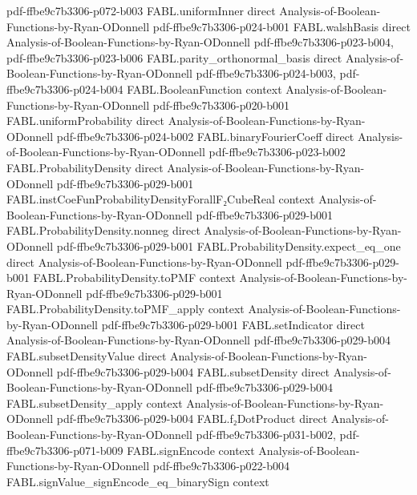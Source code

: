 \begin{theorem}
  {pdf-ffbe9c7b3306-p072-b003}
\proofstep
  {FABL.uniformInner}
  {direct}
  {Analysis-of-Boolean-Functions-by-Ryan-ODonnell}
  {pdf-ffbe9c7b3306-p024-b001}
\proofstep
  {FABL.walshBasis}
  {direct}
  {Analysis-of-Boolean-Functions-by-Ryan-ODonnell}
  {pdf-ffbe9c7b3306-p023-b004,
    pdf-ffbe9c7b3306-p023-b006}
\proofstep
  {FABL.parity_orthonormal_basis}
  {direct}
  {Analysis-of-Boolean-Functions-by-Ryan-ODonnell}
  {pdf-ffbe9c7b3306-p024-b003,
    pdf-ffbe9c7b3306-p024-b004}
\proofstep
  {FABL.BooleanFunction}
  {context}
  {Analysis-of-Boolean-Functions-by-Ryan-ODonnell}
  {pdf-ffbe9c7b3306-p020-b001}
\proofstep
  {FABL.uniformProbability}
  {direct}
  {Analysis-of-Boolean-Functions-by-Ryan-ODonnell}
  {pdf-ffbe9c7b3306-p024-b002}
\proofstep
  {FABL.binaryFourierCoeff}
  {direct}
  {Analysis-of-Boolean-Functions-by-Ryan-ODonnell}
  {pdf-ffbe9c7b3306-p023-b002}
\proofstep
  {FABL.ProbabilityDensity}
  {direct}
  {Analysis-of-Boolean-Functions-by-Ryan-ODonnell}
  {pdf-ffbe9c7b3306-p029-b001}
\proofstep
  {FABL.instCoeFunProbabilityDensityForallF₂CubeReal}
  {context}
  {Analysis-of-Boolean-Functions-by-Ryan-ODonnell}
  {pdf-ffbe9c7b3306-p029-b001}
\proofstep
  {FABL.ProbabilityDensity.nonneg}
  {direct}
  {Analysis-of-Boolean-Functions-by-Ryan-ODonnell}
  {pdf-ffbe9c7b3306-p029-b001}
\proofstep
  {FABL.ProbabilityDensity.expect_eq_one}
  {direct}
  {Analysis-of-Boolean-Functions-by-Ryan-ODonnell}
  {pdf-ffbe9c7b3306-p029-b001}
\proofstep
  {FABL.ProbabilityDensity.toPMF}
  {context}
  {Analysis-of-Boolean-Functions-by-Ryan-ODonnell}
  {pdf-ffbe9c7b3306-p029-b001}
\proofstep
  {FABL.ProbabilityDensity.toPMF_apply}
  {context}
  {Analysis-of-Boolean-Functions-by-Ryan-ODonnell}
  {pdf-ffbe9c7b3306-p029-b001}
\proofstep
  {FABL.setIndicator}
  {direct}
  {Analysis-of-Boolean-Functions-by-Ryan-ODonnell}
  {pdf-ffbe9c7b3306-p029-b004}
\proofstep
  {FABL.subsetDensityValue}
  {direct}
  {Analysis-of-Boolean-Functions-by-Ryan-ODonnell}
  {pdf-ffbe9c7b3306-p029-b004}
\proofstep
  {FABL.subsetDensity}
  {direct}
  {Analysis-of-Boolean-Functions-by-Ryan-ODonnell}
  {pdf-ffbe9c7b3306-p029-b004}
\proofstep
  {FABL.subsetDensity_apply}
  {context}
  {Analysis-of-Boolean-Functions-by-Ryan-ODonnell}
  {pdf-ffbe9c7b3306-p029-b004}
\proofstep
  {FABL.f₂DotProduct}
  {direct}
  {Analysis-of-Boolean-Functions-by-Ryan-ODonnell}
  {pdf-ffbe9c7b3306-p031-b002,
    pdf-ffbe9c7b3306-p071-b009}
\proofstep
  {FABL.signEncode}
  {context}
  {Analysis-of-Boolean-Functions-by-Ryan-ODonnell}
  {pdf-ffbe9c7b3306-p022-b004}
\proofstep
  {FABL.signValue_signEncode_eq_binarySign}
  {context}

\end{theorem}
